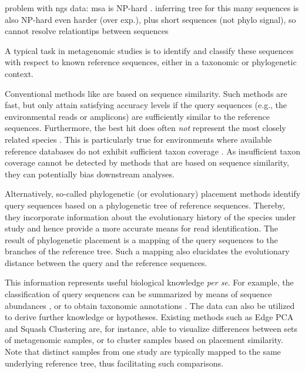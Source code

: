 problem with ngs data:
msa is NP-hard \cite{Just2001}.
inferring tree for this many sequences is also NP-hard \cite{Chor2005} even harder (over exp.), plus
short sequences (not phylo signal), so cannot resolve relationtips between sequences


A typical task in metagenomic studies is to identify and classify these sequences with respect
to known reference sequences, either in a taxonomic or phylogenetic context.

Conventional methods like  \cite{Altschul1990} are based on sequence similarity.
Such methods are fast, but only attain satisfying accuracy levels
if the query sequences (e.g., the environmental reads or amplicons) are sufficiently similar to the reference sequences.
Furthermore, the best  hit does often \emph{not} represent the most closely related species \cite{Koski2001}.
This is particularly true for environments where available reference databases
do not exhibit sufficient taxon coverage \citep{Mahe2017}.
As insufficient taxon coverage cannot be detected by methods that are based on sequence similarity,
they can potentially bias downstream analyses.

Alternatively, so-called phylogenetic (or evolutionary) placement methods \cite{Matsen2010,Berger2011,Barbera2018}
identify query sequences based on a phylogenetic tree of reference sequences.
Thereby, they incorporate information about the evolutionary history of the species under study
and hence provide a more accurate means for read identification.
The result of phylogenetic placement is a mapping of the query sequences to the branches of the reference tree.
Such a mapping also elucidates the evolutionary distance between the query and the reference sequences.

This information represents useful biological knowledge \emph{per se}.
For example, the classification of query sequences can be summarized by means of sequence abundances \cite{Pace1997,Hugenholtz1998},
or to obtain taxonomic annotations \cite{Kozlov2016}.
The data can also be utilized to derive further knowledge or hypotheses.
Existing methods such as Edge PCA and Squash Clustering \cite{Matsen2011a} are, for instance, able
to visualize differences between sets of metagenomic samples,
or to cluster samples based on placement similarity.
Note that distinct samples from one study are typically mapped to the same underlying reference tree,
thus facilitating such comparisons.



